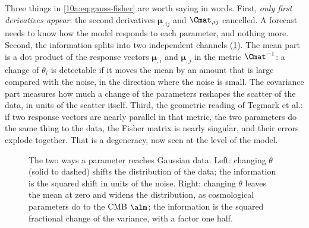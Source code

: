 Three things in \eqref{10a:eq:gauss-fisher} are worth saying in words. First, \emph{only first derivatives
appear}: the second derivatives $\bm\mu_{,ij}$ and $\Cmat_{,ij}$ cancelled. A forecast needs to know how the
model responds to each parameter, and nothing more. Second, the information splits into two independent
channels (\cref{10a:fig:channels}). The mean part is a dot product of the response vectors
$\bm\mu_{,i}$ and $\bm\mu_{,j}$ in the metric $\Cmat^{-1}$: a change of $\theta_i$ is detectable if it moves the
mean by an amount that is large compared with the noise, in the direction where the noise is small. The
covariance part measures how much a change of the parameters reshapes the scatter of the data, in units of
the scatter itself. Third, the geometric reading of Tegmark et al.: if two response vectors are nearly
parallel in that metric, the two parameters do the same thing to the data, the Fisher matrix is nearly
singular, and their errors explode together. That is a degeneracy, now seen at the level of the model.

\begin{figure}[htbp]
\centering
{}
\caption{The two ways a parameter reaches Gaussian data. Left: changing $\theta$ (solid to dashed) shifts the
distribution of the data; the information is the squared shift in units of the noise. Right: changing
$\theta$ leaves the mean at zero and widens the distribution, as cosmological parameters do to the CMB
$\alm$; the information is the squared fractional change of the variance, with a factor one half.}
\label{10a:fig:channels}
\end{figure}

